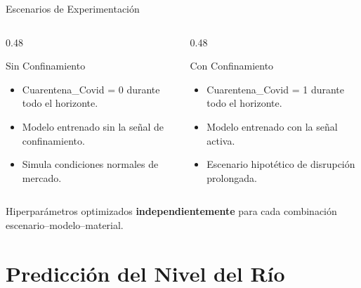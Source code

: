 \documentclass[12pt, aspectratio=169]{beamer}
\begin{document}
\begin{frame}{Escenarios de Experimentaci\'on}
\begin{columns}[T]
  \begin{column}{0.48\textwidth}
    \begin{exampleblock}{Sin Confinamiento}
    \small
    \begin{itemize}
      \item Cuarentena\_Covid = 0 durante todo el horizonte.
      \item Modelo entrenado sin la se\~nal de confinamiento.
      \item Simula condiciones normales de mercado.
    \end{itemize}
    \end{exampleblock}
  \end{column}
  \begin{column}{0.48\textwidth}
    \begin{alertblock}{Con Confinamiento}
    \small
    \begin{itemize}
      \item Cuarentena\_Covid = 1 durante todo el horizonte.
      \item Modelo entrenado con la se\~nal activa.
      \item Escenario hipot\'etico de disrupci\'on prolongada.
    \end{itemize}
    \end{alertblock}
  \end{column}
\end{columns}

\vspace{0.4cm}
\centering
\small Hiperpar\'ametros optimizados \textbf{independientemente} para cada combinaci\'on escenario--modelo--material.
\end{frame}

\section{Predicci\'on del Nivel del R\'io}
\end{document}
